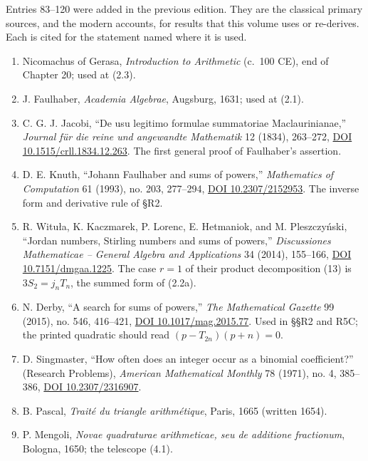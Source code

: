 \documentclass[
  11pt,
]{book}
\providecommand{\tightlist}{%
  \setlength{\itemsep}{0pt}\setlength{\parskip}{0pt}}
\begin{document}
Entries 83--120 were added in the previous edition. They are the
classical primary sources, and the modern accounts, for results that
this volume uses or re-derives. Each is cited for the statement named
where it is used.

\begin{enumerate}
\def\labelenumi{\arabic{enumi}.}
\setcounter{enumi}{82}
\tightlist
\item
  Nicomachus of Gerasa, \emph{Introduction to Arithmetic} (c.~100 CE),
  end of Chapter 20; used at (2.3).
\item
  J. Faulhaber, \emph{Academia Algebrae}, Augsburg, 1631; used at (2.1).
\item
  C. G. J. Jacobi, ``De usu legitimo formulae summatoriae
  Maclaurinianae,'' \emph{Journal für die reine und angewandte
  Mathematik} 12 (1834), 263--272,
  \href{https://doi.org/10.1515/crll.1834.12.263}{DOI
  10.1515/crll.1834.12.263}. The first general proof of Faulhaber's
  assertion.
\item
  D. E. Knuth, ``Johann Faulhaber and sums of powers,''
  \emph{Mathematics of Computation} 61 (1993), no. 203, 277--294,
  \href{https://doi.org/10.2307/2152953}{DOI 10.2307/2152953}. The
  inverse form and derivative rule of §R2.
\item
  R. Wituła, K. Kaczmarek, P. Lorenc, E. Hetmaniok, and M. Pleszczyński,
  ``Jordan numbers, Stirling numbers and sums of powers,''
  \emph{Discussiones Mathematicae -- General Algebra and Applications}
  34 (2014), 155--166, \href{https://doi.org/10.7151/dmgaa.1225}{DOI
  10.7151/dmgaa.1225}. The case \(r=1\) of their product decomposition
  (13) is \(3S_2=j_nT_n\), the summed form of (2.2a).
\item
  N. Derby, ``A search for sums of powers,'' \emph{The Mathematical
  Gazette} 99 (2015), no. 546, 416--421,
  \href{https://doi.org/10.1017/mag.2015.77}{DOI 10.1017/mag.2015.77}.
  Used in §§R2 and R5C; the printed quadratic should read
  \((p-T_{2n})(p+n)=0\).
\item
  D. Singmaster, ``How often does an integer occur as a binomial
  coefficient?'' (Research Problems), \emph{American Mathematical
  Monthly} 78 (1971), no. 4, 385--386,
  \href{https://doi.org/10.2307/2316907}{DOI 10.2307/2316907}.
\item
  B. Pascal, \emph{Traité du triangle arithmétique}, Paris, 1665
  (written 1654).
\item
  P. Mengoli, \emph{Novae quadraturae arithmeticae, seu de additione
  fractionum}, Bologna, 1650; the telescope (4.1).

\end{enumerate}
\end{document}
